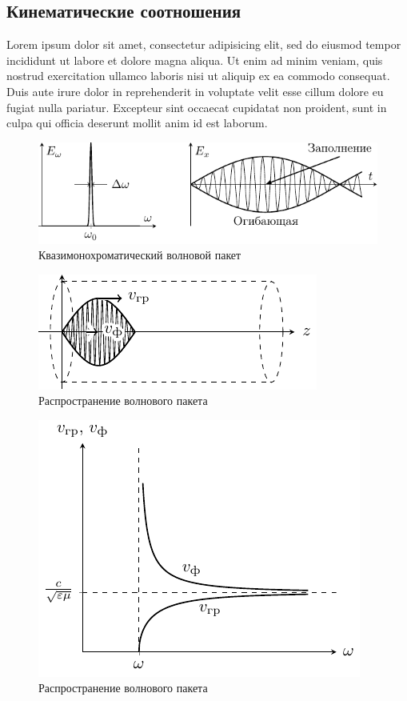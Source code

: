 \subsection{Кинематические соотношения}
Lorem ipsum dolor sit amet, consectetur adipisicing elit, sed do eiusmod
tempor incididunt ut labore et dolore magna aliqua. Ut enim ad minim veniam,
quis nostrud exercitation ullamco laboris nisi ut aliquip ex ea commodo
consequat. Duis aute irure dolor in reprehenderit in voluptate velit esse
cillum dolore eu fugiat nulla pariatur. Excepteur sint occaecat cupidatat non
proident, sunt in culpa qui officia deserunt mollit anim id est laborum.
\begin{figure}[H]
	\centering
	\includegraphics[scale=1.5]{img/lect3_ris8}
	\caption{Квазимонохроматический волновой пакет}
	\label{fig:lect3:8}
\end{figure}

\begin{figure}[H]
	\centering
	\includegraphics[scale=1.5]{img/lect3_ris9}
	\caption{Распространение волнового пакета}
	\label{fig:lect3:9}
\end{figure}

\begin{figure}[H]
	\centering
	\includegraphics[scale=1.5]{img/lect3_ris10}
	\caption{Распространение волнового пакета}
	\label{fig:lect3:10}
\end{figure}

